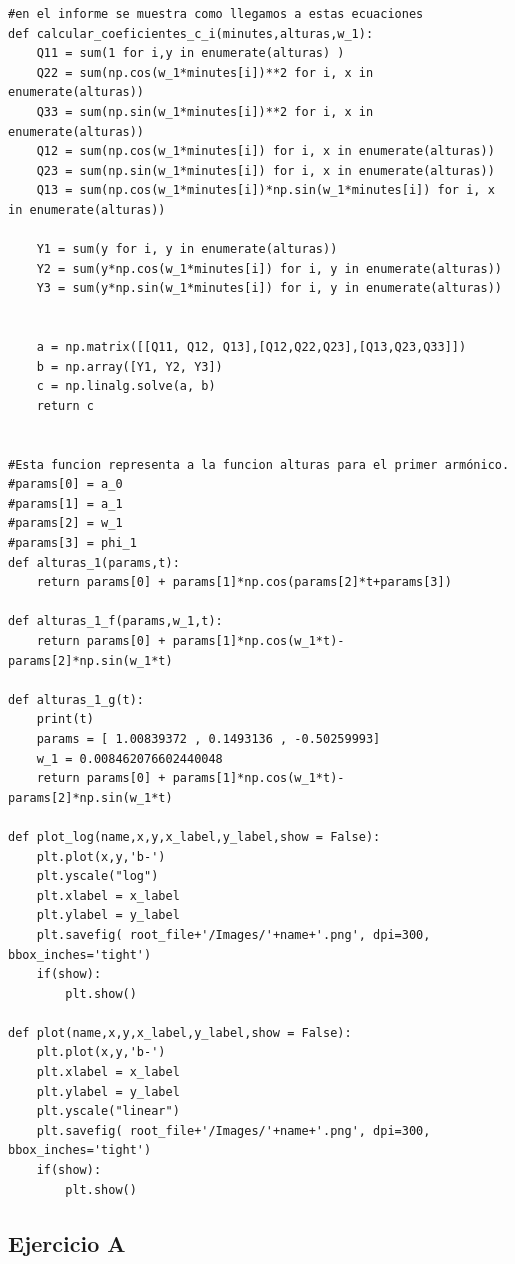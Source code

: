 \documentclass[10pt,a4paper]{article}
\numberwithin{equation}{section}
\numberwithin{figure}{section}
\numberwithin{table}{section}
\begin{document}
\begin{verbatim}
#en el informe se muestra como llegamos a estas ecuaciones
def calcular_coeficientes_c_i(minutes,alturas,w_1):
    Q11 = sum(1 for i,y in enumerate(alturas) )
    Q22 = sum(np.cos(w_1*minutes[i])**2 for i, x in enumerate(alturas))
    Q33 = sum(np.sin(w_1*minutes[i])**2 for i, x in enumerate(alturas))
    Q12 = sum(np.cos(w_1*minutes[i]) for i, x in enumerate(alturas))
    Q23 = sum(np.sin(w_1*minutes[i]) for i, x in enumerate(alturas))
    Q13 = sum(np.cos(w_1*minutes[i])*np.sin(w_1*minutes[i]) for i, x in enumerate(alturas))

    Y1 = sum(y for i, y in enumerate(alturas))
    Y2 = sum(y*np.cos(w_1*minutes[i]) for i, y in enumerate(alturas))
    Y3 = sum(y*np.sin(w_1*minutes[i]) for i, y in enumerate(alturas))

    
    a = np.matrix([[Q11, Q12, Q13],[Q12,Q22,Q23],[Q13,Q23,Q33]])
    b = np.array([Y1, Y2, Y3])
    c = np.linalg.solve(a, b)
    return c


#Esta funcion representa a la funcion alturas para el primer armónico.
#params[0] = a_0
#params[1] = a_1
#params[2] = w_1
#params[3] = phi_1
def alturas_1(params,t):
    return params[0] + params[1]*np.cos(params[2]*t+params[3])

def alturas_1_f(params,w_1,t):
    return params[0] + params[1]*np.cos(w_1*t)- params[2]*np.sin(w_1*t)
    
def alturas_1_g(t):
    print(t)
    params = [ 1.00839372 , 0.1493136 , -0.50259993]
    w_1 = 0.008462076602440048
    return params[0] + params[1]*np.cos(w_1*t)- params[2]*np.sin(w_1*t)

def plot_log(name,x,y,x_label,y_label,show = False):
    plt.plot(x,y,'b-')
    plt.yscale("log")
    plt.xlabel = x_label
    plt.ylabel = y_label
    plt.savefig( root_file+'/Images/'+name+'.png', dpi=300, bbox_inches='tight')
    if(show):
        plt.show()
    
def plot(name,x,y,x_label,y_label,show = False):
    plt.plot(x,y,'b-')
    plt.xlabel = x_label
    plt.ylabel = y_label
    plt.yscale("linear")
    plt.savefig( root_file+'/Images/'+name+'.png', dpi=300, bbox_inches='tight')
    if(show):
        plt.show()

\end{verbatim}

\subsection{Ejercicio A}
\end{document}
